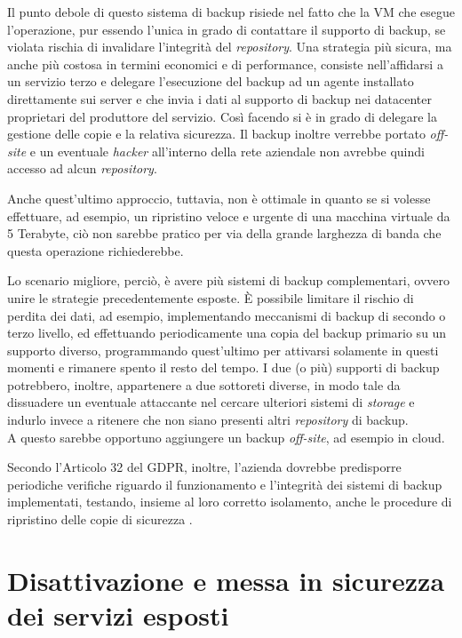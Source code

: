 \documentclass[target=bach,aauheader=]{thud}
\begin{document}
Il punto debole di questo sistema di backup risiede nel fatto che la VM che esegue l'operazione, pur essendo l'unica in grado di contattare il supporto di backup, se violata rischia di invalidare l'integrità del \textit{repository}. Una strategia più sicura, ma anche più costosa in termini economici e di performance, consiste nell'affidarsi a un servizio terzo e delegare l'esecuzione del backup ad un agente installato direttamente sui server e che invia i dati al supporto di backup nei datacenter proprietari del produttore del servizio. Così facendo si è in grado di delegare la gestione delle copie e la relativa sicurezza. Il backup inoltre verrebbe portato \textit{off-site} e un eventuale \textit{hacker} all'interno della rete aziendale non avrebbe quindi accesso ad alcun \textit{repository}.

Anche quest'ultimo approccio, tuttavia, non è ottimale in quanto se si volesse effettuare, ad esempio, un ripristino veloce e urgente di una macchina virtuale da 5 Terabyte, ciò non sarebbe pratico per via della grande larghezza di banda che questa operazione richiederebbe.

Lo scenario migliore, perciò, è avere più sistemi di backup complementari, ovvero unire le strategie precedentemente esposte. È possibile limitare il rischio di perdita dei dati, ad esempio, implementando meccanismi di backup di secondo o terzo livello, ed effettuando periodicamente una copia del backup primario su un supporto diverso, programmando quest'ultimo per attivarsi solamente in questi momenti e rimanere spento il resto del tempo. I due (o più) supporti di backup potrebbero, inoltre, appartenere a due sottoreti diverse, in modo tale da dissuadere un eventuale attaccante nel cercare ulteriori sistemi di \textit{storage} e indurlo invece a ritenere che non siano presenti altri \textit{repository} di backup.
\\ A questo sarebbe opportuno aggiungere un backup \textit{off-site}, ad esempio in cloud.

Secondo l'Articolo 32 del GDPR, inoltre, l'azienda dovrebbe predisporre periodiche verifiche riguardo il funzionamento e l'integrità dei sistemi di backup implementati, testando, insieme al loro corretto isolamento, anche le procedure di ripristino delle copie di sicurezza \cite{backup}.

\section{Disattivazione e messa in sicurezza dei servizi esposti}
\end{document}
